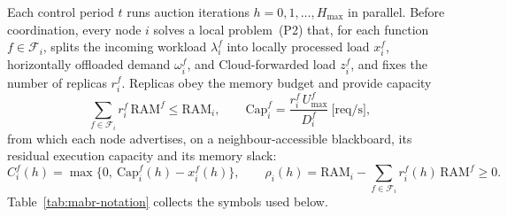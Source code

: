 Each control period $t$ runs auction iterations $h=0,1,\dots,H_{\max}$ in
parallel. Before coordination, every node $i$ solves a local problem~(P2)
that, for each function $f\in\mathcal{F}_i$, splits the incoming workload
$\lambda_i^f$ into locally processed load $x_i^f$, horizontally offloaded
demand $\omega_i^f$, and Cloud-forwarded load $z_i^f$, and fixes the number of
replicas $r_i^f$. Replicas obey the memory budget and provide capacity
\begin{equation}
  \sum_{f\in\mathcal{F}_i} r_i^f\,\mathrm{RAM}^f \le \mathrm{RAM}_i,
  \qquad
  \mathrm{Cap}_i^f = \frac{r_i^f\,U^f_{\max}}{D_i^f}\ \text{[req/s]} ,
  \tag{1,2}
\end{equation}
from which each node advertises, on a neighbour-accessible blackboard, its
residual execution capacity and its memory slack:
\begin{equation}
  C_i^f(h) = \max\!\big\{0,\ \mathrm{Cap}_i^f(h) - x_i^f(h)\big\},
  \qquad
  \rho_i(h) = \mathrm{RAM}_i - \sum_{f\in\mathcal{F}_i} r_i^f(h)\,\mathrm{RAM}^f \ge 0 .
  \tag{12,13}
\end{equation}
Table~\ref{tab:mabr-notation} collects the symbols used below.

